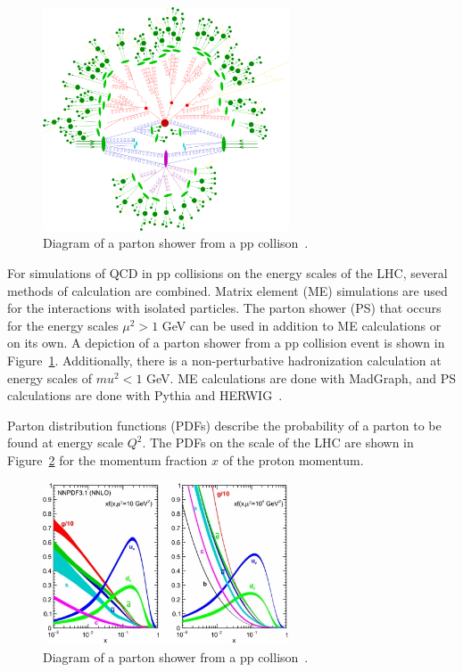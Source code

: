 \begin{figure}[h]
	\centering
	\includegraphics[width=0.65\textwidth]{figures/parton_shower.png}
	\caption{Diagram of a parton shower from a pp collison~\cite{PartonShower}.}
	\label{fig:ps}
\end{figure}

For simulations of QCD in pp collisions on the energy scales of the LHC, several methods of calculation are combined. Matrix element (ME) simulations are used for the interactions with isolated particles. The parton shower (PS) that occurs for the energy scales $\mu^2 > 1$ GeV can be used in addition to ME calculations or on its own. A depiction of a parton shower from a pp collision event is shown in Figure~\ref{fig:ps}. Additionally, there is a non-perturbative hadronization calculation at energy scales of $mu^2 < 1$ GeV. ME calculations are done with MadGraph, and PS calculations are done with Pythia and HERWIG~\cite{MadGraph,pythia8}.

Parton distribution functions (PDFs) describe the probability of a parton to be found at energy scale $Q^2$. The PDFs on the scale of the LHC are shown in Figure~\ref{fig:pdf} for the momentum fraction $x$ of the proton momentum.

\begin{figure}[h]
	\centering
	\includegraphics[width=0.65\textwidth]{figures/pdf_lhc.png}
	\caption{Diagram of a parton shower from a pp collison~\cite{pdfs}.}
	\label{fig:pdf}
\end{figure}



